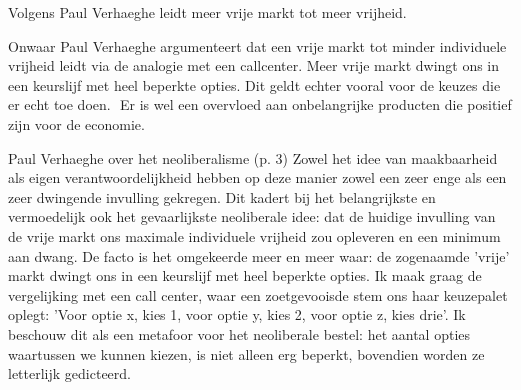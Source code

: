\documentclass[main.tex]{subfiles}
\begin{document}
\begin{examenvraag}
    \begin{stelling}
        Volgens Paul Verhaeghe leidt meer vrije markt tot meer vrijheid.
    \end{stelling}

    \begin{stelling-antwoord}{Onwaar}
        Paul Verhaeghe argumenteert dat een vrije markt tot minder 
        individuele vrijheid leidt via de analogie met een callcenter.
		Meer vrije markt dwingt ons in een keurslijf met heel beperkte 
		opties. Dit geldt echter vooral voor de keuzes die er echt toe doen.‭ ‬
		Er is wel een overvloed aan onbelangrijke producten die positief zijn 
		voor de economie. 
        
        \begin{citaat}{Paul Verhaeghe over het neoliberalisme (p. 3)}
            Zowel het idee van maakbaarheid als eigen verantwoordelijkheid hebben op deze manier zowel een zeer enge als een zeer dwingende invulling gekregen.
            Dit kadert bij het belangrijkste en vermoedelijk ook het gevaarlijkste neoliberale idee: dat de huidige invulling van de vrije markt ons maximale individuele vrijheid zou opleveren en een minimum aan dwang.
            De facto is het omgekeerde meer en meer waar: de zogenaamde 'vrije' markt dwingt ons in een keurslijf met heel beperkte opties.
            Ik maak graag de vergelijking met een call center, waar een zoetgevooisde stem ons haar keuzepalet oplegt: 'Voor optie x, kies 1, voor optie y, kies 2, voor optie z, kies drie'.
            Ik beschouw dit als een metafoor voor het neoliberale bestel: het aantal opties waartussen we kunnen kiezen, is niet alleen erg beperkt, bovendien worden ze letterlijk gedicteerd.
        \end{citaat}
    \end{stelling-antwoord}
\end{examenvraag}
\end{document}
